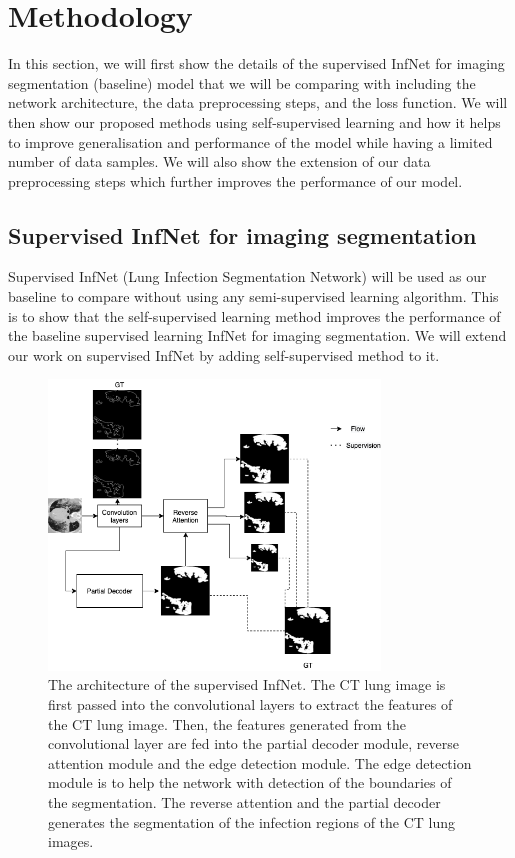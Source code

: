 \section{Methodology}


In this section, we will first show the details of the supervised InfNet for imaging segmentation (baseline) model that we will be comparing with including the network architecture, the data preprocessing steps, and the loss function. We will then show our proposed methods using self-supervised learning and how it helps to improve generalisation and performance of the model while having a limited number of data samples. We will also show the extension of our data preprocessing steps which further improves the performance of our model.

\subsection{Supervised InfNet for imaging segmentation}
Supervised InfNet	(Lung Infection Segmentation Network) will be used as our baseline \cite{ref14} to compare without using any semi-supervised learning algorithm. This is to show that the self-supervised learning method  improves the performance of the baseline supervised learning InfNet for imaging segmentation. We will extend our work on supervised InfNet by adding self-supervised method to it.

\begin{figure}
	\includegraphics[width=88mm]{supervised-inf-net.png}
	\caption{The architecture of the supervised InfNet. The CT lung image is first passed into the convolutional layers to extract the features of the CT lung image. Then, the features generated from the convolutional layer are fed into the partial decoder module, reverse attention module and the edge detection module. The edge detection module is to help the network with detection of the boundaries of the segmentation. The reverse attention and the partial decoder generates the segmentation of the infection regions of the CT lung images. }
	\label{fig:supervised-inf-net_arch}
\end{figure}

